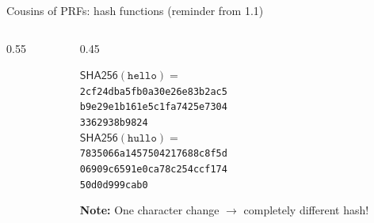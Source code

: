 \ifdefined\PRESENTATION\else\PassOptionsToClass{handout}{beamer}\fi\documentclass[aspectratio=169, lualatex]{beamer}
\begin{document}
\begin{frame}{Cousins of PRFs: hash functions (reminder from 1.1)}
	\begin{columns}[c]
		\begin{column}{0.55\textwidth}
		\end{column}
		\begin{column}{0.45\textwidth}
			\begin{tcolorbox}
				[colback=black!5!white,colframe=ciphergray] $\mathsf{SHA256}(\texttt{hello}) =$ \\ {\small\texttt{2cf24dba5fb0a30e26e83b2ac5}\\ \texttt{b9e29e1b161e5c1fa7425e7304}\\
					\texttt{3362938b9824}}\\[1em]
				$\mathsf{SHA256}(\texttt{hullo}) =$ \\ {\small\texttt{7835066a1457504217688c8f5d}\\
					\texttt{06909c6591e0ca78c254ccf174}\\ \texttt{50d0d999cab0}}
			\end{tcolorbox}
			\textcolor{cipherprimary}{\textbf{Note:} \small One character change $\rightarrow$
				completely different hash!}
		\end{column}
	\end{columns}
\end{frame}
\end{document}
